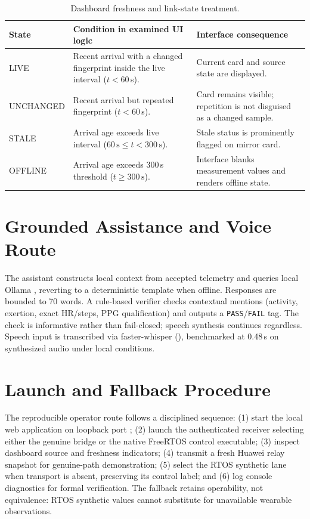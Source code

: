 \begin{table}[H]
\centering
\footnotesize
\renewcommand{\arraystretch}{0.98}
\caption{Dashboard freshness and link-state treatment.}
\label{tab:freshness-states}
\begin{tabularx}{\textwidth}{p{32mm}p{38mm}Y}
\toprule
\textbf{State} & \textbf{Condition in examined UI logic} & \textbf{Interface consequence}\\
\midrule
LIVE & Recent arrival with a changed fingerprint inside the live interval ($t < 60$\,s). & Current card and source state are displayed.\\
UNCHANGED & Recent arrival but repeated fingerprint ($t < 60$\,s). & Card remains visible; repetition is not disguised as a changed sample.\\
STALE & Arrival age exceeds live interval ($60\,\mathrm{s} \le t < 300\,\mathrm{s}$). & Stale status is prominently flagged on mirror card.\\
OFFLINE & Arrival age exceeds 300\,s threshold ($t \ge 300\,\mathrm{s}$). & Interface blanks measurement values and renders offline state.\\
\bottomrule
\end{tabularx}
\end{table}

\section{Grounded Assistance and Voice Route}
The assistant constructs local context from accepted telemetry and queries local Ollama , reverting to a deterministic template when offline. Responses are bounded to 70 words. A rule-based verifier checks contextual mentions (activity, exertion, exact HR/steps, PPG qualification) and outputs a \texttt{PASS}/\texttt{FAIL} tag. The check is informative rather than fail-closed; speech synthesis continues regardless. Speech input is transcribed via faster-whisper  (), benchmarked at 0.48\,s on synthesized audio under local conditions.

\section{Launch and Fallback Procedure}
The reproducible operator route follows a disciplined sequence: (1) start the local web application on loopback port ; (2) launch the authenticated receiver selecting either the genuine bridge or the native FreeRTOS control executable; (3) inspect dashboard source and freshness indicators; (4) transmit a fresh Huawei relay snapshot for genuine-path demonstration; (5) select the RTOS synthetic lane when transport is absent, preserving its control label; and (6) log console diagnostics for formal verification. The fallback retains operability, not equivalence: RTOS synthetic values cannot substitute for unavailable wearable observations.


